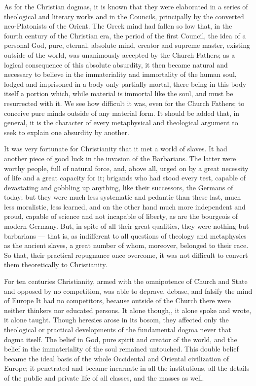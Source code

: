 \documentclass[12pt]{report}
\begin{document}
As for the Christian dogmas, it is known that they were elaborated in a series of theological and literary works and in the Councils, principally by the converted neo-Platonists of the Orient. The Greek mind had fallen so low that, in the fourth century of the Christian era, the period of the first Council, the idea of a personal God, pure, eternal, absolute mind, creator and supreme master, existing outside of the world, was unanimously accepted by the Church Fathers; as a logical consequence of this absolute absurdity, it then became natural and necessary to believe in the immateriality and immortality of the human soul, lodged and imprisoned in a body only partially mortal, there being in this body itself a portion which, while material is immortal like the soul, and must be resurrected with it. We see how difficult it was, even for the Church Fathers; to conceive pure minds outside of any material form. It should be added that, in general, it is the character of every metaphysical and theological argument to seek to explain one absurdity by another.


It was very fortunate for Christianity that it met a world of slaves. It had another piece of good luck in the invasion of the Barbarians. The latter were worthy people, full of natural force, and, above all, urged on by a great necessity of life and a great capacity for it; brigands who had stood every test, capable of devastating and gobbling up anything, like their successors, the Germans of today; but they were much less systematic and pedantic than these last, much less moralistic, less learned, and on the other hand much more independent and proud, capable of science and not incapable of liberty, as are the bourgeois of modern Germany. But, in spite of all their great qualities, they were nothing but barbarians — that is, as indifferent to all questions of theology and metaphysics as the ancient slaves, a great number of whom, moreover, belonged to their race. So that, their practical repugnance once overcome, it was not difficult to convert them theoretically to Christianity.


For ten centuries Christianity, armed with the omnipotence of Church and State and opposed by no competition, was able to deprave, debase, and falsify the mind of Europe It had no competitors, because outside of the Church there were neither thinkers nor educated persons. It alone though,, it alone spoke and wrote, it alone taught. Though heresies arose in its bosom, they affected only the theological or practical developments of the fundamental dogma never that dogma itself. The belief in God, pure spirit and creator of the world, and the belief in the immateriality of the soul remained untouched. This double belief became the ideal basis of the whole Occidental and Oriental civilization of Europe; it penetrated and became incarnate in all the institutions, all the details of the public and private life of all classes, and the masses as well.
\end{document}
